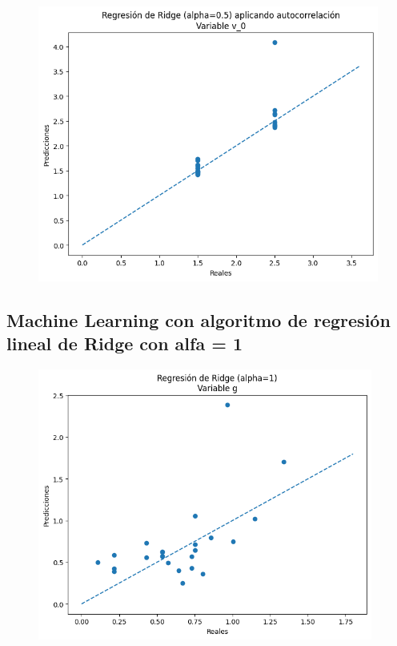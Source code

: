 \documentclass[oneside,openright,titlepage,numbers=noenddot,openany,headinclude,footinclude=true,
cleardoublepage=empty,abstractoff,BCOR=5mm,paper=a4,fontsize=12pt,main=spanish]{scrreprt}
\begin{document}
\begin{figure}[H]
	\centering
	\includegraphics[width=12cm]{Regresión de Ridge (alpha=0.5) aplicando autocorrelación Variable v_0.png}
\end{figure}

\subsection{Machine Learning con algoritmo de regresión lineal de Ridge con alfa = 1}

\begin{figure}[H]
	\centering
	\includegraphics[width=11cm]{Regresión de Ridge (alpha=1) Variable g.png}
\end{figure}
\end{document}
